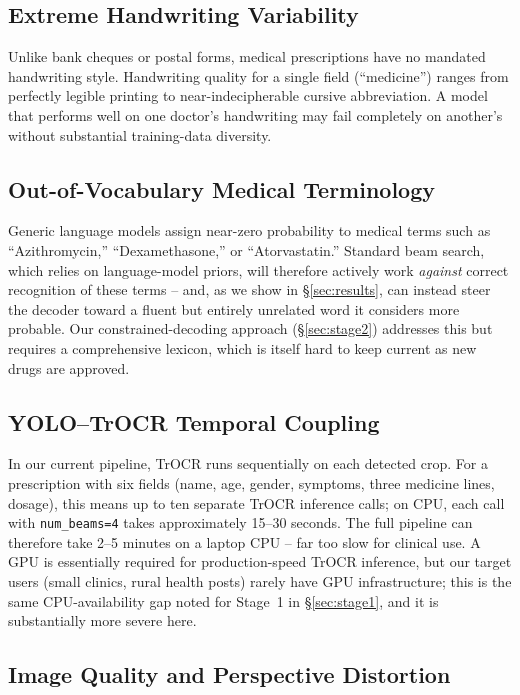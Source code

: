 \documentclass[conference]{IEEEtran}
\begin{document}
\subsection{Extreme Handwriting Variability}

Unlike bank cheques or postal forms, medical prescriptions have no mandated handwriting style. Handwriting quality for a single field (``medicine'') ranges from perfectly legible printing to near-indecipherable cursive abbreviation. A model that performs well on one doctor's handwriting may fail completely on another's without substantial training-data diversity.

\subsection{Out-of-Vocabulary Medical Terminology}
\label{sec:oov}

Generic language models assign near-zero probability to medical terms such as ``Azithromycin,'' ``Dexamethasone,'' or ``Atorvastatin.'' Standard beam search, which relies on language-model priors, will therefore actively work \emph{against} correct recognition of these terms -- and, as we show in \S\ref{sec:results}, can instead steer the decoder toward a fluent but entirely unrelated word it considers more probable. Our constrained-decoding approach (\S\ref{sec:stage2}) addresses this but requires a comprehensive lexicon, which is itself hard to keep current as new drugs are approved.

\subsection{YOLO--TrOCR Temporal Coupling}
\label{sec:temporal-coupling}

In our current pipeline, TrOCR runs sequentially on each detected crop. For a prescription with six fields (name, age, gender, symptoms, three medicine lines, dosage), this means up to ten separate TrOCR inference calls; on CPU, each call with \texttt{num\_beams=4} takes approximately 15--30 seconds. The full pipeline can therefore take 2--5 minutes on a laptop CPU -- far too slow for clinical use. A GPU is essentially required for production-speed TrOCR inference, but our target users (small clinics, rural health posts) rarely have GPU infrastructure; this is the same CPU-availability gap noted for Stage~1 in \S\ref{sec:stage1}, and it is substantially more severe here.

\subsection{Image Quality and Perspective Distortion}
\label{sec:image-quality}
\end{document}
